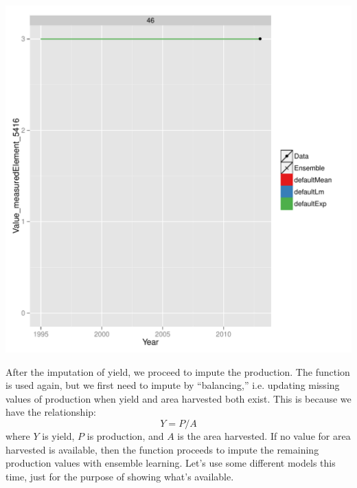 \documentclass[nojss]{jss}
\begin{document}
\begin{knitrout}
\color{fgcolor}\begin{kframe}
\begin{alltt}
\hlstd{(}   
\end{alltt}
\end{kframe}

{\centering \includegraphics[width=\maxwidth]{figure/unnamed-chunk-5-1} 

}



\end{knitrout}

After the imputation of yield, we proceed to impute the production.  The
function  is used again, but we first need to impute
by ``balancing,'' i.e. updating missing values of production when yield and
area harvested both exist.  This is because we have the relationship:
$$Y = P / A$$
where $Y$ is yield, $P$ is production, and $A$ is the area harvested.
If no value for area harvested is available, then the function proceeds to
impute the remaining production values with ensemble learning.  Let's use
some different models this time, just for the purpose of showing what's
available.
\end{document}
